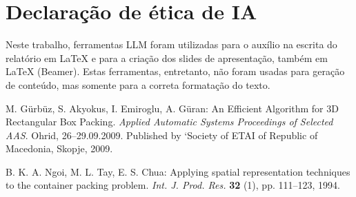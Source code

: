 \documentclass[12pt]{article}
\begin{document}
\section{Declaração de ética de IA}

Neste trabalho, ferramentas LLM foram utilizadas para o auxílio na escrita do relatório em LaTeX e para a criação dos slides de apresentação, também em LaTeX (Beamer).
Estas ferramentas, entretanto, não foram usadas para geração de conteúdo, mas somente para a correta formatação do texto.


\begin{thebibliography}{99}

	 M. G\"{u}rb\"{u}z, S. Akyokus, I. Emiroglu, A. G\"{u}ran: An Efficient Algorithm for 3D Rectangular Box Packing. \emph{Applied Automatic Systems Proceedings of Selected AAS}. Ohrid, 26--29.09.2009. Published by `Society of ETAI of Republic of Macedonia, Skopje, 2009.

	 B. K. A. Ngoi, M. L. Tay, E. S. Chua: Applying spatial representation techniques to the container packing problem. \emph{Int. J. Prod. Res.} \textbf{32} (1), pp. 111--123, 1994.

\end{thebibliography}
\end{document}
